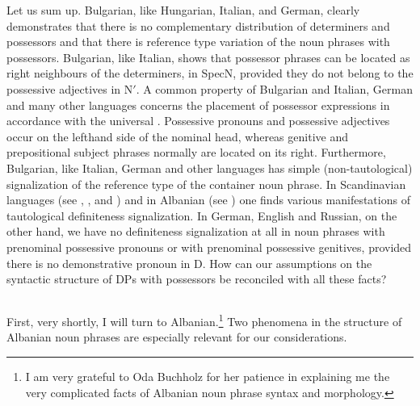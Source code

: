 \documentclass[output=paper,colorlinks,citecolor=brown]{langscibook}
\begin{document}
Let us sum up. Bulgarian, like Hungarian, Italian, and German, clearly demonstrates that there is no complementary distribution of determiners and possessors and that there is reference type variation of the noun phrases with possessors. Bulgarian, like Italian, shows that possessor phrases can be located as right neighbours of the determiners, in SpecN, provided they do not belong to the possessive adjectives in N$'$. A common property of Bulgarian and Italian, German and many other languages concerns the placement of possessor expressions in accordance with the universal . Possessive pronouns and possessive adjectives occur on the lefthand side of the nominal head, whereas genitive and prepositional subject phrases normally are located on its right. Furthermore, Bulgarian, like Italian, German and other languages has simple (non-tautological) signalization of the reference type of the container noun phrase. In Scandinavian languages (see \citealt{Hellan86The-headedness}, \citealt{Delsing88The-Scandinavian, Delsing90A-DP-analysis}, and \citealt{Vater89Determinantien-in-DP}) and in Albanian (see \citealt{Buchholz87Albanische-grammatik}) one finds various manifestations of tautological definiteness signalization. In German, English and Russian, on the other hand, we have no definiteness signalization at all in noun phrases with prenominal possessive pronouns or with prenominal possessive genitives, provided there is no demonstrative pronoun in D. How can our assumptions on the syntactic structure of DPs with possessors be reconciled with all these facts?

\subsection{} \label{sec:zi91:4.3}

First, very shortly, I will turn to Albanian.\footnote{I am very grateful to Oda Buchholz for her patience in explaining me the very complicated facts of Albanian noun phrase syntax and morphology.} Two phenomena in the structure of Albanian noun phrases are especially relevant for our considerations.
\end{document}
